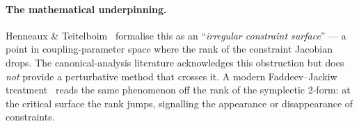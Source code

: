 \paragraph{The mathematical underpinning.}
Henneaux \& Teitelboim~\cite[\S 1.4.3]{HenneauxTeitelboim1992} formalise
this as an ``\emph{irregular constraint surface}'' --- a point in
coupling-parameter space where the rank of the constraint Jacobian
drops.  The canonical-analysis literature acknowledges this obstruction
but does \emph{not} provide a perturbative method that crosses it.  A
modern Faddeev--Jackiw treatment~\cite{DiazSaldivia2025} reads the same
phenomenon off the rank of the symplectic 2-form: at the critical surface
the rank jumps, signalling the appearance or disappearance of constraints.

